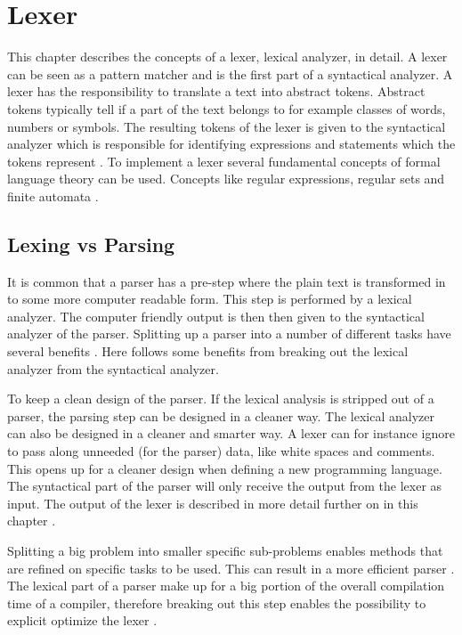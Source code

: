 \chapter{Lexer \label{chap:lexer}}
This chapter describes the concepts of a lexer, lexical analyzer, in detail. A
lexer can be seen as a pattern matcher and is the first part of a syntactical
analyzer. A lexer has the responsibility to translate a text into abstract
tokens. Abstract tokens typically tell if a part of the text belongs to for
example classes of words, numbers or symbols. The resulting tokens of the lexer
is given to the syntactical analyzer which is responsible for identifying
expressions and statements which the tokens represent \cite{sebesta2012}.
To implement a lexer several fundamental concepts of
formal language theory can be used. Concepts like regular expressions, regular
sets and finite automata \cite{Aho1990}.

\section{Lexing vs Parsing}
It is common that a parser has a pre-step where the plain text is transformed
in to some more computer readable form. This step is performed by a lexical
analyzer.
The computer friendly output is then then given to the syntactical analyzer of
the parser. Splitting up a parser into a number of different tasks have several
benefits \cite{sebesta2012}. Here follows some benefits from breaking out the
lexical analyzer from the syntactical analyzer.

To keep a clean design of the parser. If the lexical analysis is stripped out of
a parser, the parsing step can be designed in a cleaner way. The lexical
analyzer can also be designed in a cleaner and smarter way. A lexer can for
instance ignore to pass along unneeded (for the parser) data, like white spaces
and comments. This opens up for a cleaner design when defining a new programming
language. The syntactical part of the parser will only receive the output from
the lexer as input. The output of the lexer is described in more detail further
on in this chapter \cite{Aho2006}.

\newpage

Splitting a big problem into smaller specific sub-problems enables methods that
are refined on specific tasks to be used. This can result in a more efficient
parser \cite{Aho2006}. The lexical part of a parser make up for a big portion
of the overall compilation time of a compiler, therefore breaking out this step
enables the possibility to explicit optimize the lexer \cite{sebesta2012}.


